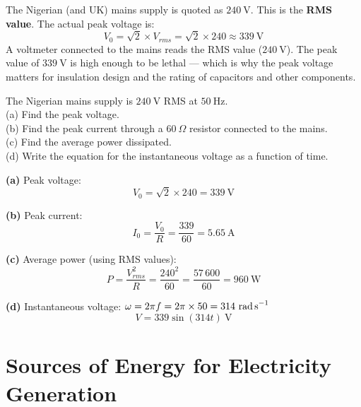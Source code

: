 \begin{keybox}
The Nigerian (and UK) mains supply is quoted as
$240\ \text{V}$. This is the \textbf{RMS value}.
The actual peak voltage is:
\[
  V_0 = \sqrt{2} \times V_{rms}
  = \sqrt{2} \times 240 \approx 339\ \text{V}
\]
A voltmeter connected to the mains reads the RMS
value ($240\ \text{V}$). The peak value of $339\ \text{V}$
is high enough to be lethal --- which is why the
peak voltage matters for insulation design and the
rating of capacitors and other components.
\end{keybox}

\begin{examplebox}[24.6]
The Nigerian mains supply is $240\ \text{V}$ RMS
at $50\ \text{Hz}$.\\
(a) Find the peak voltage.\\
(b) Find the peak current through a $60\ \Omega$
resistor connected to the mains.\\
(c) Find the average power dissipated.\\
(d) Write the equation for the instantaneous
voltage as a function of time.
\end{examplebox}

\begin{solutionbox}
\textbf{(a)} Peak voltage:
\[
  V_0 = \sqrt{2} \times 240 = 339\ \text{V}
\]

\textbf{(b)} Peak current:
\[
  I_0 = \frac{V_0}{R} = \frac{339}{60}
  = 5.65\ \text{A}
\]

\textbf{(c)} Average power (using RMS values):
\[
  P = \frac{V_{rms}^2}{R} = \frac{240^2}{60}
  = \frac{57\,600}{60} = 960\ \text{W}
\]

\textbf{(d)} Instantaneous voltage:
$\omega = 2\pi f = 2\pi \times 50 = 314\ \text{rad\,s}^{-1}$
\[
  V = 339\sin(314t)\ \text{V}
\]
\end{solutionbox}

\section{Sources of Energy for Electricity Generation}

